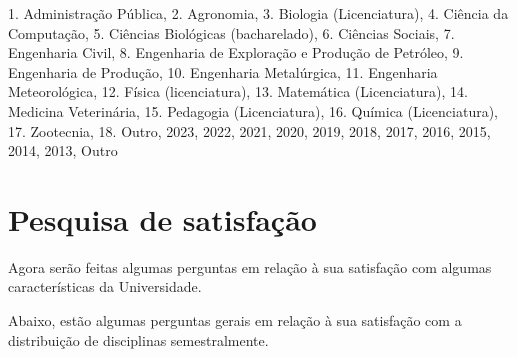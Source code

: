 \begin{apendicesenv}
\begin{Form}[action=mailto:joaovitorfd2000@gmai.com, encoding=html, method=post]
    \begin{enumerate}
      {
        1. Administração Pública,
        2. Agronomia,
        3. Biologia (Licenciatura),
        4. Ciência da Computação,
        5. Ciências Biológicas (bacharelado),
        6. Ciências Sociais,
        7. Engenharia Civil,
        8. Engenharia de Exploração e Produção de Petróleo,
        9. Engenharia de Produção,
        10. Engenharia Metalúrgica,
        11. Engenharia Meteorológica,
        12. Física (licenciatura),
        13. Matemática (Licenciatura),
        14. Medicina Veterinária,
        15. Pedagogia (Licenciatura),
        16. Química (Licenciatura),
        17. Zootecnia,
        18. Outro,
      }
      { 2023, 2022, 2021, 2020, 2019, 2018, 2017, 2016, 2015, 2014, 2013, Outro }
    \end{enumerate}

    \section*{Pesquisa de satisfação}

    Agora serão feitas algumas perguntas em relação à sua satisfação com algumas características da Universidade.

    Abaixo, estão algumas perguntas gerais em relação à sua satisfação com a distribuição de disciplinas semestralmente.

    \newcommand{\ChoiceMenuPeriodos}[2]{
      \QuestionNameOptions{#1}{#2}{ 0, 1, 2, 3, 4, 5, 6, 7, 8, 9, 10 }
    }

    \newcommand{\ChoiceMenuSNO}[2]{
      \QuestionNameOptions{#1}{#2}{1. Sim, 2. Não, 3. Outro }
    }

    \newcommand{\ChoiceMenuDdNcC}[2]{
      \QuestionNameOptions{#1}{#2}
      {
        1. Discordo completamente,
        2. Discordo parcialmente,
        3. Não tenho preferência,
        4. Concordo parcialmente,
        5. Concordo completamente
      }
    }


\end{Form}
\end{apendicesenv}
